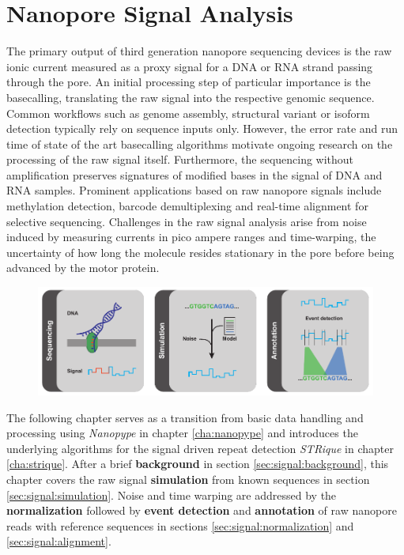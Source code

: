\chapter{Nanopore Signal Analysis}
\label{cha:signal}

The primary output of third generation nanopore sequencing devices is the raw ionic current measured as a proxy signal for a DNA or RNA strand passing through the pore. 
An initial processing step of particular importance is the basecalling, translating the raw signal into the respective genomic sequence.
Common workflows such as genome assembly, structural variant or isoform detection typically rely on sequence inputs only.
However, the error rate and run time of state of the art basecalling algorithms motivate ongoing research on the processing of the raw signal itself. Furthermore, the sequencing without amplification preserves signatures of modified bases in the signal of DNA and RNA samples.
Prominent applications based on raw nanopore signals include methylation detection, barcode demultiplexing and real-time alignment for selective sequencing.
Challenges in the raw signal analysis arise from noise induced by measuring currents in pico ampere ranges and time-warping, the uncertainty of how long the molecule resides stationary in the pore before being advanced by the motor protein.


\begin{figure}[h]
    \centering
    \includegraphics[width=1.0\textwidth]{figures/signal/GA.pdf}
    \label{fig:signal:ga}
\end{figure}


The following chapter serves as a transition from basic data handling and processing using \textit{Nanopype} in chapter \ref{cha:nanopype} and introduces the underlying algorithms for the signal driven repeat detection \textit{STRique} in chapter \ref{cha:strique}.
After a brief \textbf{background} in section \ref{sec:signal:background}, this chapter covers the raw signal \textbf{simulation} from known sequences in section \ref{sec:signal:simulation}. Noise and time warping are addressed by the \textbf{normalization} followed by \textbf{event detection} and \textbf{annotation} of raw nanopore reads with reference sequences in sections \ref{sec:signal:normalization} and \ref{sec:signal:alignment}.


